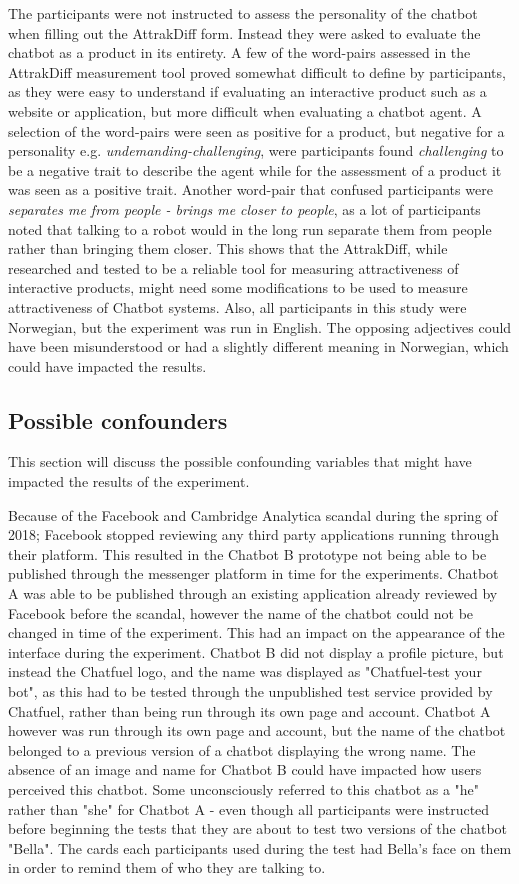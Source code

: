 The participants were not instructed to assess the personality of the chatbot when filling out the AttrakDiff form. Instead they were asked to evaluate the chatbot as a product in its entirety. A few of the word-pairs assessed in the AttrakDiff measurement tool proved somewhat difficult to define by participants, as they were easy to understand if evaluating an interactive product such as a website or application, but more difficult when evaluating a chatbot agent. A selection of the word-pairs were seen as positive for a product, but negative for a personality e.g. \textit{undemanding-challenging}, were participants found \textit{challenging} to be a negative trait to describe the agent while for the assessment of a product it was seen as a positive trait. Another word-pair that confused participants were \textit{separates me from people - brings me closer to people}, as a lot of participants noted that talking to a robot would in the long run separate them from people rather than bringing them closer. This shows that the AttrakDiff, while researched and tested to be a reliable tool for measuring attractiveness of interactive products, might need some modifications to be used to measure attractiveness of Chatbot systems. Also, all participants in this study were Norwegian, but the experiment was run in English. The opposing adjectives could have been misunderstood or had a slightly different meaning in Norwegian, which could have impacted the results.

\subsection{Possible confounders}
This section will discuss the possible confounding variables that might have impacted the results of the experiment.

Because of the Facebook and Cambridge Analytica scandal during the spring of 2018; Facebook stopped reviewing any third party applications running through their platform. This resulted in the Chatbot B prototype not being able to be published through the messenger platform in time for the experiments. Chatbot A was able to be published through an existing application already reviewed by Facebook before the scandal, however the name of the chatbot could not be changed in time of the experiment. This had an impact on the appearance of the interface during the experiment. Chatbot B did not display a profile picture, but instead the Chatfuel logo, and the name was displayed as "Chatfuel-test your bot", as this had to be tested through the unpublished test service provided by Chatfuel, rather than being run through its own page and account. Chatbot A however was run through its own page and account, but the name of the chatbot belonged to a previous version of a chatbot displaying the wrong name. The absence of an image and name for Chatbot B could have impacted how users perceived this chatbot. Some unconsciously referred to this chatbot as a "he" rather than "she" for Chatbot A - even though all participants were instructed before beginning the tests that they are about to test two versions of the chatbot "Bella". The cards each participants used during the test had Bella's face on them in order to remind them of who they are talking to. 

